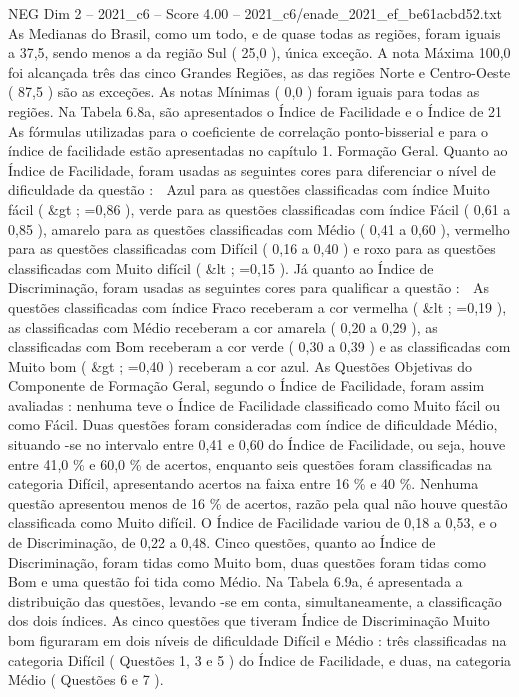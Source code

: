 \begin{textsample}{NEG Dim 2 – 2021\_c6 – Score 4.00 – 2021\_c6/enade\_2021\_ef\_be61acbd52.txt}
As Medianas do Brasil, como um todo, e de quase todas as regiões, foram iguais a 37,5, sendo menos a da região Sul ( 25,0 ), única exceção.
A nota Máxima 100,0 foi alcançada três das cinco Grandes Regiões, as das regiões Norte e Centro-Oeste ( 87,5 ) são as exceções.
As notas Mínimas ( 0,0 ) foram iguais para todas as regiões.
Na Tabela 6.8a, são apresentados o Índice de Facilidade e o Índice de 21 As fórmulas utilizadas para o coeficiente de correlação ponto-bisserial e para o índice de facilidade estão apresentadas no capítulo 1.
Formação Geral.
Quanto ao Índice de Facilidade, foram usadas as seguintes cores para diferenciar o nível de dificuldade da questão :  Azul para as questões classificadas com índice Muito fácil ( \&gt ; =0,86 ), verde para as questões classificadas com índice Fácil ( 0,61 a 0,85 ), amarelo para as questões classificadas com Médio ( 0,41 a 0,60 ), vermelho para as questões classificadas com Difícil ( 0,16 a 0,40 ) e roxo para as questões classificadas com Muito difícil ( \&lt ; =0,15 ).
Já quanto ao Índice de Discriminação, foram usadas as seguintes cores para qualificar a questão :  As questões classificadas com índice Fraco receberam a cor vermelha ( \&lt ; =0,19 ), as classificadas com Médio receberam a cor amarela ( 0,20 a 0,29 ), as classificadas com Bom receberam a cor verde ( 0,30 a 0,39 ) e as classificadas com Muito bom ( \&gt ; =0,40 ) receberam a cor azul.
As Questões Objetivas do Componente de Formação Geral, segundo o Índice de Facilidade, foram assim avaliadas : nenhuma teve o Índice de Facilidade classificado como Muito fácil ou como Fácil.
Duas questões foram consideradas com índice de dificuldade Médio, situando -se no intervalo entre 0,41 e 0,60 do Índice de Facilidade, ou seja, houve entre 41,0 \% e 60,0 \% de acertos, enquanto seis questões foram classificadas na categoria Difícil, apresentando acertos na faixa entre 16 \% e 40 \%.
Nenhuma questão apresentou menos de 16 \% de acertos, razão pela qual não houve questão classificada como Muito difícil.
O Índice de Facilidade variou de 0,18 a 0,53, e o de Discriminação, de 0,22 a 0,48.
Cinco questões, quanto ao Índice de Discriminação, foram tidas como Muito bom, duas questões foram tidas como Bom e uma questão foi tida como Médio.
Na Tabela 6.9a, é apresentada a distribuição das questões, levando -se em conta, simultaneamente, a classificação dos dois índices.
As cinco questões que tiveram Índice de Discriminação Muito bom figuraram em dois níveis de dificuldade Difícil e Médio : três classificadas na categoria Difícil ( Questões 1, 3 e 5 ) do Índice de Facilidade, e duas, na categoria Médio ( Questões 6 e 7 ).

\end{textsample}
